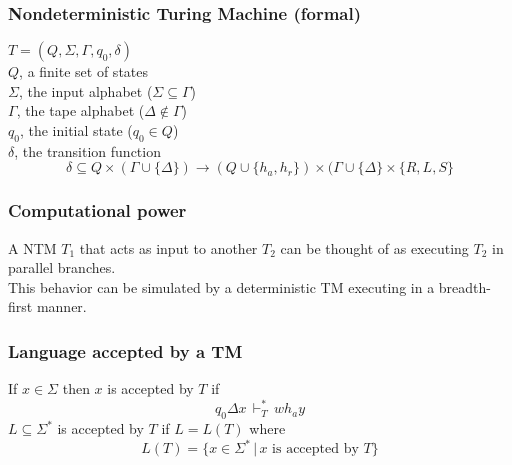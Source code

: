 \begin{frame}
    \frametitle{Nondeterministic Turing Machine (formal)}
    $T = (Q, \Sigma, \Gamma, q_0, \delta)$\\

    \vspace{10 pt}
    $Q$, a finite set of states\\
    $\Sigma$, the input alphabet ($\Sigma \subseteq \Gamma$)\\
    $\Gamma$, the tape alphabet ($\Delta \not\in \Gamma$)\\
    $q_0$, the initial state ($q_0 \in Q$)\\
    $\delta$, the transition function\\
    \[\delta \subseteq Q \times (\Gamma \cup \{\Delta\}) \rightarrow (Q \cup
    \{h_a, h_r\}) \times (\Gamma \cup \{\Delta\} \times \{R, L, S\}\]
\end{frame}

\begin{frame}
    \frametitle{Computational power}
    A NTM $T_1$ that acts as input to another $T_2$ can be thought of as
    executing $T_2$ in parallel branches.\\
    \pause
    This behavior can be simulated by a deterministic TM executing in a
    breadth-first manner.
\end{frame}

\begin{frame}
    \frametitle{Language accepted by a TM}
    If $x \in \Sigma$ then $x$ is accepted by $T$ if
    \[q_0 \Delta x \,\vdash^{\ast}_{T}\, w h_a y\]
    $L \subseteq \Sigma^\ast$ is accepted by $T$ if $L = L(T)$ where
    \[L(T) = \{x \in \Sigma^\ast \,|\, x \text{ is accepted by } T\}\]
\end{frame}


